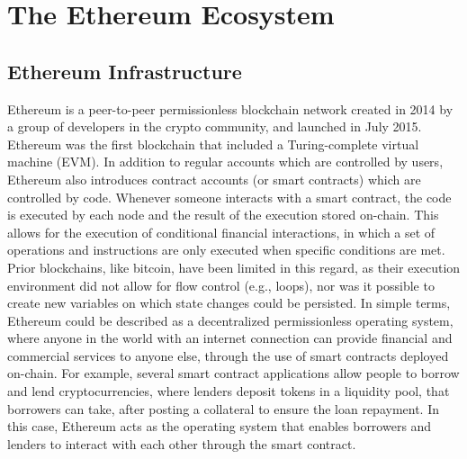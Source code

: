 \documentclass[No]{AEA}
\begin{document}
\section{The Ethereum Ecosystem}


\subsection{Ethereum Infrastructure}


Ethereum is a peer-to-peer permissionless blockchain network created in 2014 by a group of developers in the crypto community, and launched in July 2015. Ethereum was the first blockchain that included a Turing-complete virtual machine (EVM). In addition to regular accounts which are controlled by users, Ethereum also introduces contract accounts (or smart contracts) which are controlled by code. Whenever someone interacts with a smart contract, the code is executed by each node and the result of the execution stored on-chain. This allows for the execution of conditional financial interactions, in which a set of operations and instructions are only executed when specific conditions are met. Prior blockchains, like bitcoin, have been limited in this regard, as their execution environment did not allow for flow control (e.g., loops), nor was it possible to create new variables on which state changes could be persisted. In simple terms, Ethereum could be described as a decentralized permissionless operating system, where anyone in the world with an internet connection can provide financial and commercial services to anyone else, through the use of smart contracts deployed on-chain. For example, several smart contract applications allow people to borrow and lend cryptocurrencies, where lenders deposit tokens in a liquidity pool, that borrowers can take, after posting a collateral to ensure the loan repayment. In this case, Ethereum acts as the operating system that enables borrowers and lenders to interact with each other through the smart contract.
\end{document}
